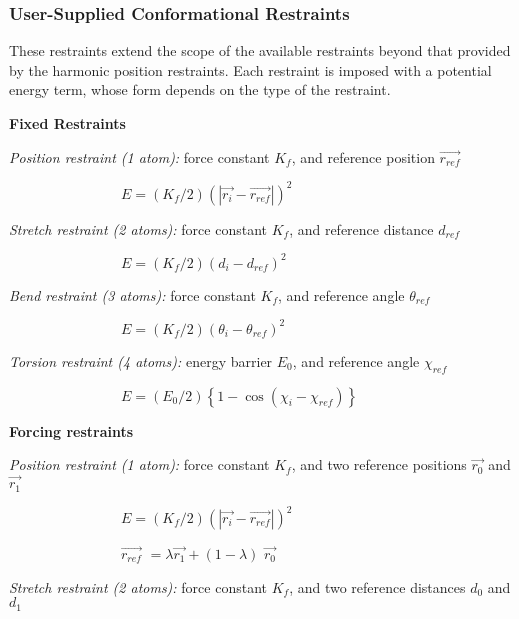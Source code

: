 
\subsubsection{User-Supplied Conformational Restraints}

These restraints extend the scope of the available restraints beyond that
provided by the harmonic position restraints. Each restraint is imposed with
a potential energy term, whose form depends on the type of the
restraint.\medskip

{\bf Fixed Restraints}

{\em Position restraint (1 atom):} force constant $K_{f}$, and reference
position $\overrightarrow{r_{ref}}$

$\qquad \qquad \qquad \qquad E=\left( K_{f}/2\right) \left( \left| 
\overrightarrow{r_{i}}-\overrightarrow{r_{ref}}\right| \right) ^{2}$

{\em Stretch restraint (2 atoms):} force constant $K_{f}$, and reference
distance $d_{ref}$

$\qquad \qquad \qquad \qquad E=\left( K_{f}/2\right) \left(
d_{i}-d_{ref}\right) ^{2}$

{\em Bend restraint (3 atoms):} force constant $K_{f}$, and reference angle $%
\theta _{ref}$

$\qquad \qquad \qquad \qquad E=\left( K_{f}/2\right) \left( \theta
_{i}-\theta _{ref}\right) ^{2}$

{\em Torsion restraint (4 atoms):} energy barrier $E_{0}$, and reference
angle $\chi _{ref}$

$\qquad \qquad \qquad \qquad E=\left( E_{0}/2\right) \left\{ 1-\cos \left(
\chi _{i}-\chi _{ref}\right) \right\} $

{\bf Forcing restraints}

{\em Position restraint (1 atom):} force constant $K_{f}$, and two reference
positions $\overrightarrow{r_{0}}$ and $\overrightarrow{r_{1}}$

$\qquad \qquad \qquad \qquad E=\left( K_{f}/2\right) \left( \left| 
\overrightarrow{r_{i}}-\overrightarrow{r_{ref}}\right| \right) ^{2}$

$\qquad \qquad \qquad \qquad \overrightarrow{r_{ref}}$ $=\lambda 
\overrightarrow{r_{1}}+\left( 1-\lambda \right) $ $\overrightarrow{r_{0}}$

{\em Stretch restraint (2 atoms):} force constant $K_{f}$, and two reference
distances $d_{0}$ and $d_{1}$

